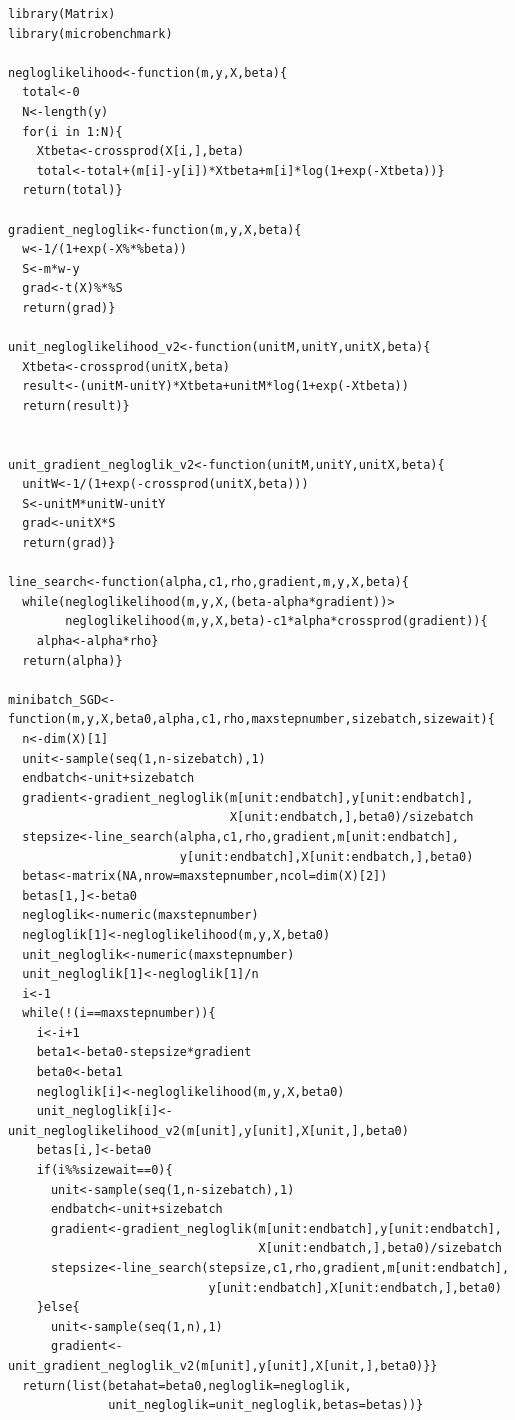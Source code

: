 \documentclass{article}
\begin{document}
\begin{lstlisting}
library(Matrix)
library(microbenchmark)

negloglikelihood<-function(m,y,X,beta){
  total<-0
  N<-length(y)
  for(i in 1:N){
    Xtbeta<-crossprod(X[i,],beta)
    total<-total+(m[i]-y[i])*Xtbeta+m[i]*log(1+exp(-Xtbeta))} 
  return(total)}

gradient_negloglik<-function(m,y,X,beta){
  w<-1/(1+exp(-X%*%beta))
  S<-m*w-y
  grad<-t(X)%*%S
  return(grad)}

unit_negloglikelihood_v2<-function(unitM,unitY,unitX,beta){
  Xtbeta<-crossprod(unitX,beta)
  result<-(unitM-unitY)*Xtbeta+unitM*log(1+exp(-Xtbeta))
  return(result)}


unit_gradient_negloglik_v2<-function(unitM,unitY,unitX,beta){
  unitW<-1/(1+exp(-crossprod(unitX,beta)))
  S<-unitM*unitW-unitY
  grad<-unitX*S
  return(grad)}

line_search<-function(alpha,c1,rho,gradient,m,y,X,beta){
  while(negloglikelihood(m,y,X,(beta-alpha*gradient))>
        negloglikelihood(m,y,X,beta)-c1*alpha*crossprod(gradient)){
    alpha<-alpha*rho}
  return(alpha)}

minibatch_SGD<-function(m,y,X,beta0,alpha,c1,rho,maxstepnumber,sizebatch,sizewait){
  n<-dim(X)[1]
  unit<-sample(seq(1,n-sizebatch),1)
  endbatch<-unit+sizebatch
  gradient<-gradient_negloglik(m[unit:endbatch],y[unit:endbatch],
                               X[unit:endbatch,],beta0)/sizebatch
  stepsize<-line_search(alpha,c1,rho,gradient,m[unit:endbatch],
                        y[unit:endbatch],X[unit:endbatch,],beta0)
  betas<-matrix(NA,nrow=maxstepnumber,ncol=dim(X)[2])
  betas[1,]<-beta0
  negloglik<-numeric(maxstepnumber)
  negloglik[1]<-negloglikelihood(m,y,X,beta0)
  unit_negloglik<-numeric(maxstepnumber)
  unit_negloglik[1]<-negloglik[1]/n
  i<-1
  while(!(i==maxstepnumber)){
    i<-i+1
    beta1<-beta0-stepsize*gradient
    beta0<-beta1
    negloglik[i]<-negloglikelihood(m,y,X,beta0)
    unit_negloglik[i]<-unit_negloglikelihood_v2(m[unit],y[unit],X[unit,],beta0)
    betas[i,]<-beta0
    if(i%%sizewait==0){
      unit<-sample(seq(1,n-sizebatch),1)
      endbatch<-unit+sizebatch
      gradient<-gradient_negloglik(m[unit:endbatch],y[unit:endbatch],
                                   X[unit:endbatch,],beta0)/sizebatch
      stepsize<-line_search(stepsize,c1,rho,gradient,m[unit:endbatch],
                            y[unit:endbatch],X[unit:endbatch,],beta0)
    }else{
      unit<-sample(seq(1,n),1)
      gradient<-unit_gradient_negloglik_v2(m[unit],y[unit],X[unit,],beta0)}}
  return(list(betahat=beta0,negloglik=negloglik,
              unit_negloglik=unit_negloglik,betas=betas))}


\end{lstlisting}
\end{document}
